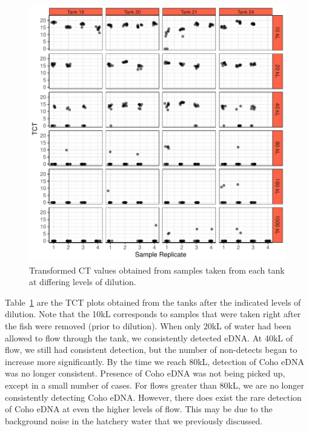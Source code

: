 \begin{figure}[H]
\includegraphics{Chapter4Images/finalflowplots.pdf}
\caption{Transformed CT values obtained from samples taken from each tank at differing levels of dilution.}
\label{fig:finalflowplot}
\end{figure}





Table~\ref{fig:finalflowplot} are the TCT plots obtained from the tanks after the indicated levels of dilution. Note that the 10kL corresponds to samples that were taken right after the fish were removed (prior to dilution). When only 20kL of water had been allowed to flow through the tank, we consistently detected eDNA. At 40kL of flow, we still had consistent detection, but the number of non-detects began to increase more significantly. By the time we reach 80kL, detection of Coho eDNA was no longer consistent. Presence of Coho eDNA was not being picked up, except in a small number of cases. For flows greater than 80kL, we are no longer consistently detecting Coho eDNA. However, there does exist the rare detection of Coho eDNA at even the higher levels of flow. This may be due to the background noise in the hatchery water that we previously discussed.

